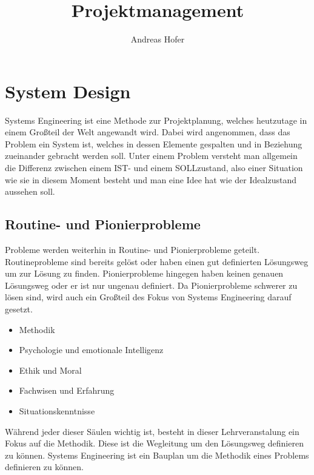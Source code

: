 \documentclass{article}
\title{\vspace{-1cm}Projektmanagement}
\author{Andreas Hofer}
\begin{document}
	\maketitle
	\tableofcontents
	\section{System Design}
	Systems Engineering ist eine Methode zur Projektplanung, welches heutzutage in einem Großteil der Welt angewandt wird. Dabei wird angenommen, dass das Problem ein System ist, welches in dessen Elemente gespalten und in Beziehung zueinander gebracht werden soll. Unter einem Problem versteht man allgemein die Differenz zwischen einem IST- und einem SOLLzustand, also einer Situation wie sie in diesem Moment besteht und man eine Idee hat wie der Idealzustand aussehen soll.
	\subsection{Routine- und Pionierprobleme}
	Probleme werden weiterhin in Routine- und Pionierprobleme geteilt. Routineprobleme sind bereits gelöst oder haben einen gut definierten Lösungsweg um zur Lösung zu finden. Pionierprobleme hingegen haben keinen genauen Lösungsweg oder er ist nur ungenau definiert. Da Pionierprobleme schwerer zu lösen sind, wird auch ein Großteil des Fokus von Systems Engineering darauf gesetzt.
	\begin{itemize}
		\item{Methodik}
		\item{Psychologie und emotionale Intelligenz}
		\item{Ethik und Moral}
		\item{Fachwisen und Erfahrung}
		\item{Situationskenntnisse}
	\end{itemize}
	Während jeder dieser Säulen wichtig ist, besteht in dieser Lehrveranstalung ein Fokus auf die Methodik. Diese ist die Wegleitung um den Lösungsweg definieren zu können. Systems Engineering ist ein Bauplan um die Methodik eines Problems definieren zu können.
\end{document}

